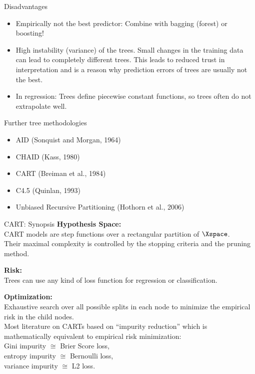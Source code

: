\documentclass[11pt,compress,t,notes=noshow, xcolor=table]{beamer}
\begin{document}

\begin{vbframe}{Disadvantages}
\begin{itemize}
\item Empirically not the best predictor: Combine with bagging (forest) or boosting!
\item High instability (variance) of the trees.
  Small changes in the training data can lead to completely different trees. This leads to reduced trust in interpretation and is a reason why prediction errors of trees are usually not the best.
\item In regression: Trees define piecewise constant functions, so trees often do not extrapolate well.
\end{itemize}
\end{vbframe}

\begin{vbframe}{Further tree methodologies}

\begin{itemize}
\item AID (Sonquist and Morgan, 1964)
\item CHAID (Kass, 1980)
\item CART (Breiman et al., 1984)
\item C4.5 (Quinlan, 1993)
\item Unbiased Recursive Partitioning (Hothorn et al., 2006)
\end{itemize}

\end{vbframe}

\begin{vbframe}{CART: Synopsis}
\textbf{Hypothesis Space:}\\
CART models are step functions over a rectangular partition of $\Xspace$.\\
Their maximal complexity is controlled by the stopping criteria and the pruning method.

\lz

\textbf{Risk:}\\
Trees can use any kind of loss function for regression or classification.

\lz

\textbf{Optimization:}\\
Exhaustive search over all possible splits in each node to minimize the empirical risk in the child nodes.\\

{\small
Most literature on CARTs based on \enquote{impurity reduction} which is mathematically equivalent to empirical risk minimization:\\
Gini impurity $\cong$ Brier Score loss,\\ entropy impurity $\cong$  
Bernoulli loss,\\ variance impurity $\cong$ L2 loss.}

\end{vbframe}

\endlecture
\end{document}
